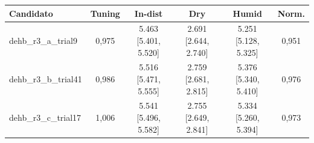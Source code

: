 \begin{tabular}{l c c c c c}
\hline
\textbf{Candidato} & \textbf{Tuning} & \textbf{In-dist} & \textbf{Dry} & \textbf{Humid} & \textbf{Norm.} \\ \hline
dehb\_r3\_a\_trial9 & 0,975 & 5.463 [5.401, 5.520] & 2.691 [2.644, 2.740] & 5.251 [5.128, 5.325] & 0,951 \\
dehb\_r3\_b\_trial41 & 0,986 & 5.516 [5.471, 5.555] & 2.759 [2.681, 2.815] & 5.376 [5.340, 5.410] & 0,976 \\
dehb\_r3\_c\_trial17 & 1,006 & 5.541 [5.496, 5.582] & 2.755 [2.649, 2.841] & 5.334 [5.260, 5.394] & 0,973 \\
\hline
\end{tabular}
